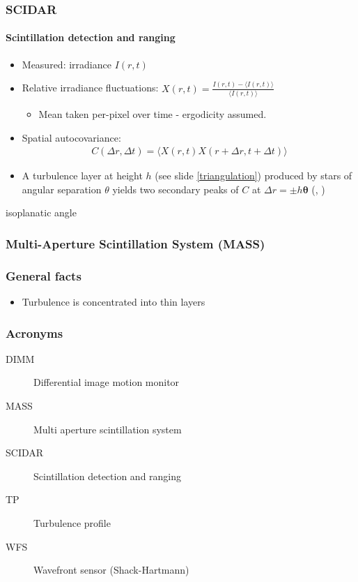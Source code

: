 \documentclass{beamer}
\newcommand*{\captionsource}[2]{%
  \caption[{#1}]{%
    #1 %
    \hspace{\linewidth}%
    Source: #2%
  }%
}
\newcommand{\tmean}[1]{\langle#1\rangle}
\newenvironment{wideitemize}{\itemize\addtolength{\itemsep}{15pt}}{\enditemize\hspace{\textwidth}}
\begin{document}
\frame
{
	\frametitle{SCIDAR}
	\framesubtitle{Scintillation detection and ranging}
	\begin{itemize}
		\item Measured: irradiance $I(r, t)$
		\item Relative irradiance fluctuations: $\displaystyle X(r, t)=\frac{I(r, t)-\tmean{I(r, t)}}{\tmean{I(r, t)}}$
		\begin{itemize}
			\item Mean taken per-pixel over time - ergodicity assumed. 
		\end{itemize}
		\item Spatial autocovariance: 
		\begin{align*}
			C(\Delta r, \Delta t)=\tmean{X(r, t)X(r+\Delta r, t+\Delta t)}
		\end{align*}
		\item A turbulence layer at height $h$ (see slide \hyperlink{triangulation}{\ref{triangulation}}) produced by stars of angular separation $\theta$ yields two secondary peaks of $C$ at $\Delta r = \pm h\pmb{\theta}$ (\cite{rocca1974detection}, \cite{prieurthese})
	\end{itemize}
}
\frame 
{
	\begin{wideitemize}
	\item isoplanatic angle
	\end{wideitemize}
}
\frame
{
	\frametitle{Multi-Aperture Scintillation System (MASS)}
}
\frame 
{
	\frametitle{General facts}
	\begin{itemize}
	\item Turbulence is concentrated into thin layers
	\end{itemize}
}
\frame
{
	\frametitle{Acronyms}
	\begin{description}
		\item[DIMM] Differential image motion monitor
		\item[MASS] Multi aperture scintillation system
		\item[SCIDAR] Scintillation detection and ranging
		\item[TP] Turbulence profile
		\item[WFS] Wavefront sensor (Shack-Hartmann)
	\end{description}

	
}
%	

\frame[allowframebreaks]
{


}
\end{document}
